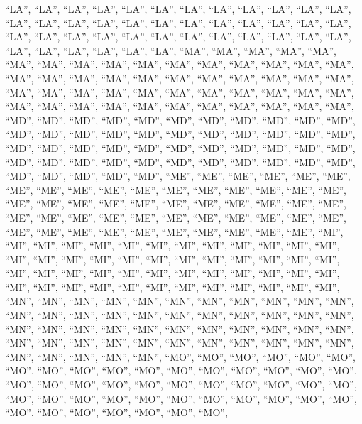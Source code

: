 \documentclass[
]{article}
\begin{document}
``LA'', ``LA'', ``LA'', ``LA'', ``LA'', ``LA'', ``LA'', ``LA'', ``LA'',
``LA'', ``LA'', ``LA'', ``LA'', ``LA'', ``LA'', ``LA'', ``LA'', ``LA'',
``LA'', ``LA'', ``LA'', ``LA'', ``LA'', ``LA'', ``LA'', ``LA'', ``LA'',
``LA'', ``LA'', ``LA'', ``LA'', ``LA'', ``LA'', ``LA'', ``LA'', ``LA'',
``LA'', ``LA'', ``LA'', ``LA'', ``LA'', ``LA'', ``MA'', ``MA'', ``MA'',
``MA'', ``MA'', ``MA'', ``MA'', ``MA'', ``MA'', ``MA'', ``MA'', ``MA'',
``MA'', ``MA'', ``MA'', ``MA'', ``MA'', ``MA'', ``MA'', ``MA'', ``MA'',
``MA'', ``MA'', ``MA'', ``MA'', ``MA'', ``MA'', ``MA'', ``MA'', ``MA'',
``MA'', ``MA'', ``MA'', ``MA'', ``MA'', ``MA'', ``MA'', ``MA'', ``MA'',
``MA'', ``MA'', ``MA'', ``MA'', ``MA'', ``MA'', ``MA'', ``MA'', ``MA'',
``MA'', ``MD'', ``MD'', ``MD'', ``MD'', ``MD'', ``MD'', ``MD'', ``MD'',
``MD'', ``MD'', ``MD'', ``MD'', ``MD'', ``MD'', ``MD'', ``MD'', ``MD'',
``MD'', ``MD'', ``MD'', ``MD'', ``MD'', ``MD'', ``MD'', ``MD'', ``MD'',
``MD'', ``MD'', ``MD'', ``MD'', ``MD'', ``MD'', ``MD'', ``MD'', ``MD'',
``MD'', ``MD'', ``MD'', ``MD'', ``MD'', ``MD'', ``MD'', ``MD'', ``MD'',
``MD'', ``MD'', ``MD'', ``MD'', ``MD'', ``ME'', ``ME'', ``ME'', ``ME'',
``ME'', ``ME'', ``ME'', ``ME'', ``ME'', ``ME'', ``ME'', ``ME'', ``ME'',
``ME'', ``ME'', ``ME'', ``ME'', ``ME'', ``ME'', ``ME'', ``ME'', ``ME'',
``ME'', ``ME'', ``ME'', ``ME'', ``ME'', ``ME'', ``ME'', ``ME'', ``ME'',
``ME'', ``ME'', ``ME'', ``ME'', ``ME'', ``ME'', ``ME'', ``ME'', ``ME'',
``ME'', ``ME'', ``ME'', ``ME'', ``ME'', ``ME'', ``ME'', ``ME'', ``ME'',
``MI'', ``MI'', ``MI'', ``MI'', ``MI'', ``MI'', ``MI'', ``MI'', ``MI'',
``MI'', ``MI'', ``MI'', ``MI'', ``MI'', ``MI'', ``MI'', ``MI'', ``MI'',
``MI'', ``MI'', ``MI'', ``MI'', ``MI'', ``MI'', ``MI'', ``MI'', ``MI'',
``MI'', ``MI'', ``MI'', ``MI'', ``MI'', ``MI'', ``MI'', ``MI'', ``MI'',
``MI'', ``MI'', ``MI'', ``MI'', ``MI'', ``MI'', ``MI'', ``MI'', ``MI'',
``MI'', ``MI'', ``MI'', ``MI'', ``MN'', ``MN'', ``MN'', ``MN'', ``MN'',
``MN'', ``MN'', ``MN'', ``MN'', ``MN'', ``MN'', ``MN'', ``MN'', ``MN'',
``MN'', ``MN'', ``MN'', ``MN'', ``MN'', ``MN'', ``MN'', ``MN'', ``MN'',
``MN'', ``MN'', ``MN'', ``MN'', ``MN'', ``MN'', ``MN'', ``MN'', ``MN'',
``MN'', ``MN'', ``MN'', ``MN'', ``MN'', ``MN'', ``MN'', ``MN'', ``MN'',
``MN'', ``MN'', ``MN'', ``MN'', ``MN'', ``MN'', ``MN'', ``MN'', ``MO'',
``MO'', ``MO'', ``MO'', ``MO'', ``MO'', ``MO'', ``MO'', ``MO'', ``MO'',
``MO'', ``MO'', ``MO'', ``MO'', ``MO'', ``MO'', ``MO'', ``MO'', ``MO'',
``MO'', ``MO'', ``MO'', ``MO'', ``MO'', ``MO'', ``MO'', ``MO'', ``MO'',
``MO'', ``MO'', ``MO'', ``MO'', ``MO'', ``MO'', ``MO'', ``MO'', ``MO'',
``MO'', ``MO'', ``MO'', ``MO'', ``MO'', ``MO'', ``MO'', ``MO'', ``MO'',
\end{document}
